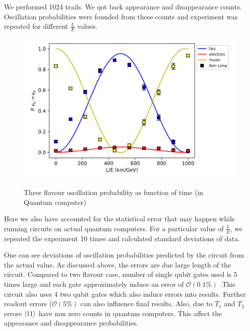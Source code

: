 \documentclass[12pt,a4paper]{report}
\begin{document}
We performed 1024 trails. We qot back appearance and disappearance counts. Oscillation probabilities were founded from these counts and experiment was repeated for different $\frac{L}{E}$ values.
\begin{figure}[h]
	\graphicspath{ {./Images/} }
	\centering	
	{\includegraphics[scale=0.8]{fig_9.png}}
	\caption{Three flavour oscillation probability as function of time (in Quantum computer) }
		\label{fig 9}
	\end{figure}\par
	Here we also have accounted for the statistical error that may happen while running circuits on actual quantum computers. For a particular value of $\frac{L}{E}$, we repeated the experiment 10 times and calculated standard deviations of data. \par 
	One can see deviations of oscillation probabilities predicted by the circuit from the actual value. As discussed above, the errors are due large length of the circuit. Compared to two flavour case, number of single qubit gates used is 5 times large and each gate approximately induce an error of $\mathcal{O}(0.1\%)$ .This circuit also uses 4 two qubit gates which also induce errors into results. Further readout errors  ($\mathcal{O}(5\%)$ can also influence final results. Also, due to $T_{1}$ and $T_{2}$ errore $\ket{11}$ have non zero counts in quantum computers. This affect the appearance and disappearance probabilities.
\end{document}
